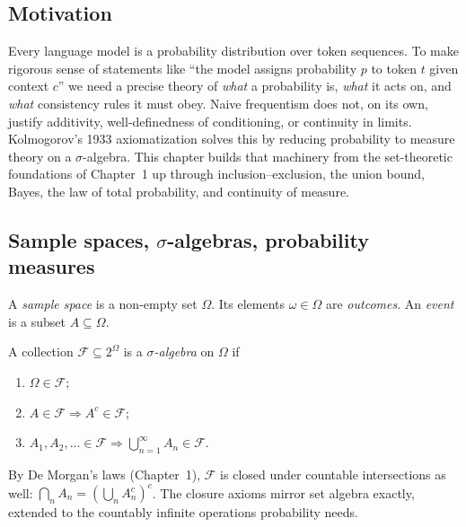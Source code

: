 \subsection*{Motivation}

Every language model is a probability distribution over token sequences. To make rigorous sense of statements like ``the model assigns probability $p$ to token $t$ given context $c$'' we need a precise theory of \emph{what} a probability is, \emph{what} it acts on, and \emph{what} consistency rules it must obey. Naive frequentism does not, on its own, justify additivity, well-definedness of conditioning, or continuity in limits. Kolmogorov's 1933 axiomatization solves this by reducing probability to measure theory on a $\sigma$-algebra. This chapter builds that machinery from the set-theoretic foundations of Chapter~1 up through inclusion--exclusion, the union bound, Bayes, the law of total probability, and continuity of measure.

\subsection*{Sample spaces, $\sigma$-algebras, probability measures}

\begin{definition}
A \emph{sample space} is a non-empty set $\Omega$. Its elements $\omega \in \Omega$ are \emph{outcomes}. An \emph{event} is a subset $A \subseteq \Omega$.
\end{definition}

\begin{definition}
A collection $\mathcal{F} \subseteq 2^{\Omega}$ is a \emph{$\sigma$-algebra} on $\Omega$ if
\begin{enumerate}
  \item $\Omega \in \mathcal{F}$;
  \item $A \in \mathcal{F} \Rightarrow A^{c} \in \mathcal{F}$;
  \item $A_{1}, A_{2}, \ldots \in \mathcal{F} \Rightarrow \bigcup_{n=1}^{\infty} A_{n} \in \mathcal{F}$.
\end{enumerate}
\end{definition}

\begin{remark}
By De Morgan's laws (Chapter~1), $\mathcal{F}$ is closed under countable intersections as well: $\bigcap_{n} A_{n} = \left(\bigcup_{n} A_{n}^{c}\right)^{c}$. The closure axioms mirror set algebra exactly, extended to the countably infinite operations probability needs.
\end{remark}

